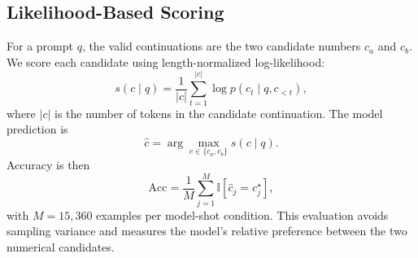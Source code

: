 \begin{table}[h!]
\centering
{}
\caption{Construction of the synthetic number-comparison benchmark. The design balances magnitude, gap, answer order, and query direction.}
\label{tab:app-comparison-task-breakdown}
\end{table}

\subsection{Likelihood-Based Scoring}
\label{app:number-comparison-scoring}

For a prompt $q$, the valid continuations are the two candidate numbers $c_a$ and $c_b$. We score each candidate using length-normalized log-likelihood:
\begin{equation}
    s(c\mid q)=\frac{1}{|c|}\sum_{t=1}^{|c|}\log p(c_t\mid q,c_{<t}),
    \label{eq:app-candidate-score}
\end{equation}
where $|c|$ is the number of tokens in the candidate continuation. The model prediction is
\begin{equation}
    \hat{c}=\arg\max_{c\in\{c_a,c_b\}} s(c\mid q).
    \label{eq:app-candidate-selection}
\end{equation}
Accuracy is then
\begin{equation}
    \mathrm{Acc}=\frac{1}{M}\sum_{j=1}^{M}\mathbb{I}[\hat{c}_j=c_j^\star],
    \label{eq:app-comparison-accuracy}
\end{equation}
with $M=15{,}360$ examples per model-shot condition. This evaluation avoids sampling variance and measures the model's relative preference between the two numerical candidates.

